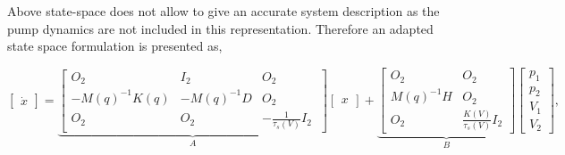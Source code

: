 Above state-space does not allow to give an accurate system description as the pump dynamics are not included in this representation. Therefore an adapted state space formulation is presented as,

\begin{equation}
     \begin{bmatrix} \dot{x}  \end{bmatrix}   =   \underbrace{ \begin{bmatrix} O_2 & I_2 & O_2 \\ -M(q)^{-1}K(q)  & -M(q)^{-1} D & O_2 \\
     O_2 & O_2    & -\frac{1}{\tau_s(V)}I_2\ \end{bmatrix}   }_A   \begin{bmatrix} x \end{bmatrix}  + \underbrace{      \begin{bmatrix} O_2 & O_2 \\ M(q)^{-1}H & O_2 \\ O_2 & \frac{K(V)}{\tau_s(V)} I_2 \end{bmatrix} }_B      \begin{bmatrix} p_1 \\ p_2  \\ V_1 \\ V_2 \end{bmatrix},
     \label{eq:ssp}
\end{equation}








